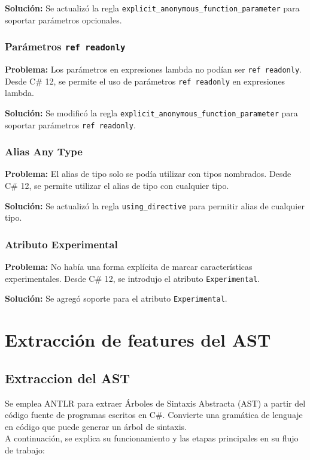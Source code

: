 \textbf{Soluci\'on:} Se actualiz\'o la regla \texttt{explicit\_anonymous\_function\_parameter} para soportar par\'ametros opcionales.

\subsection*{Par\'ametros \texttt{ref readonly}}

\textbf{Problema:} Los par\'ametros en expresiones lambda no pod\'ian ser \texttt{ref readonly}. Desde C\# 12, se permite el uso de par\'ametros \texttt{ref readonly} en expresiones lambda.

\textbf{Soluci\'on:} Se modific\'o la regla \texttt{explicit\_anonymous\_function\_parameter} para soportar par\'ametros \texttt{ref readonly}.

\subsection*{Alias Any Type}

\textbf{Problema:} El alias de tipo solo se pod\'ia utilizar con tipos nombrados. Desde C\# 12, se permite utilizar el alias de tipo con cualquier tipo.

\textbf{Soluci\'on:} Se actualiz\'o la regla \texttt{using\_directive} para permitir alias de cualquier tipo.

\subsection*{Atributo Experimental}

\textbf{Problema:} No hab\'ia una forma expl\'icita de marcar caracter\'isticas experimentales. Desde C\# 12, se introdujo el atributo \texttt{Experimental}.

\textbf{Soluci\'on:} Se agreg\'o soporte para el atributo \texttt{Experimental}.


\chapter{Extracción de features del AST}\label{chapter:proposal}

\section{Extraccion del AST}

 Se emplea ANTLR para extraer Árboles de Sintaxis Abstracta (AST) a partir del código fuente de programas escritos en C\#. Convierte una gramática de lenguaje en código que puede generar un árbol de sintaxis. \\
 A continuación, se explica su funcionamiento y las etapas principales en su flujo de trabajo:
 
